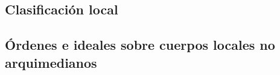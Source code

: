 \subsection{Clasificaci\'{o}n local}\label{subsec:classificationsurlocal}

\subsection{\'{O}rdenes e ideales sobre cuerpos locales no arquimedianos}%
	\label{subsec:ordeneseidealeslocal}


